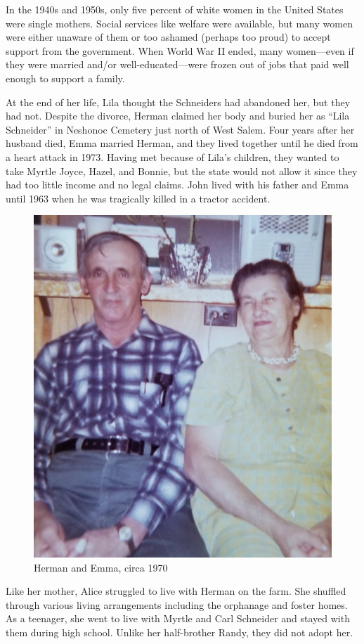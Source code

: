 \documentclass[
  letterpaper,
]{book}
\begin{document}
In the 1940s and 1950s, only five percent of white women in the United
States were single mothers. Social services like welfare were available,
but many women were either unaware of them or too ashamed (perhaps too
proud) to accept support from the government. When World War II ended,
many women---even if they were married and/or well-educated---were
frozen out of jobs that paid well enough to support a family.

At the end of her life, Lila thought the Schneiders had abandoned her,
but they had not. Despite the divorce, Herman claimed her body and
buried her as ``Lila Schneider'' in Neshonoc Cemetery just north of West
Salem. Four years after her husband died, Emma married Herman, and they
lived together until he died from a heart attack in 1973. Having met
because of Lila's children, they wanted to take Myrtle Joyce, Hazel, and
Bonnie, but the state would not allow it since they had too little
income and no legal claims. John lived with his father and Emma until
1963 when he was tragically killed in a tractor accident.

\begin{figure}[H]

{\centering \includegraphics[width=0.55\linewidth,height=\textheight,keepaspectratio]{images/Akou27rt.jpg}

}

\caption{Herman and Emma, circa 1970}

\end{figure}%

Like her mother, Alice struggled to live with Herman on the farm. She
shuffled through various living arrangements including the orphanage and
foster homes. As a teenager, she went to live with Myrtle and Carl
Schneider and stayed with them during high school. Unlike her
half-brother Randy, they did not adopt her.
\end{document}
